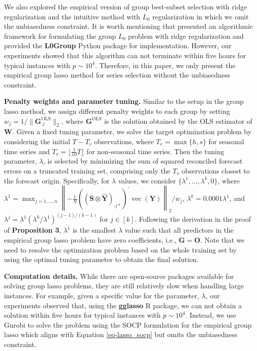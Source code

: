 \documentclass[
  11pt]{article}
\begin{document}
We also explored the empirical version of group best-subset selection
with ridge regularization and the intuitive method with \(L_0\)
regularization in which we omit the unbiasedness constraint. It is worth
mentioning that \citet{Hazimeh2023-ie} presented an algorithmic
framework for formulating the group \(L_0\) problem with ridge
regularization and provided the \textbf{L0Group} Python package for
implementation. However, our experiments showed that this algorithm can
not terminate within five hours for typical instances with
\(p \sim 10^4\). Therefore, in this paper, we only present the empirical
group lasso method for series selection without the unbiasedness
constraint.

\textbf{Penalty weights and parameter tuning.} Similar to the setup in
the group lasso method, we assign different penalty weights to each
group by setting \(w_j = 1/\|\bm{G}_{\cdot j}^{\text{OLS}}\|_2\), where
\(\bm{G}^{\text{OLS}}\) is the solution obtained by the OLS estimator of
\(\bm{W}\). Given a fixed tuning parameter, we solve the target
optimization problem by considering the initial \(T-T_v\) observations,
where \(T_v = \max\{h, s\}\) for seasonal time series and
\(T_v = \lfloor \frac{1}{10}T \rfloor\) for non-seasonal time series.
Then the tuning parameter, \(\lambda\), is selected by minimizing the
sum of squared reconciled forecast errors on a truncated training set,
comprising only the \(T_v\) observations closest to the forecast origin.
Specifically, for \(\lambda\) values, we consider
\(\{\lambda^{1},\dots,\lambda^{k}, 0\}\), where
\(\lambda^{1} = \max_{j=1, \ldots, n}\left\|-\frac{1}{N}\left(\left(\bm{S} \otimes \hat{\bm{Y}}\right)_{\cdot j*}\right)^{\prime} \operatorname{vec}(\bm{Y})\right\|_2 / w_j\),
\(\lambda^{k} = 0.0001\lambda^{1}\), and
\(\lambda^{j} = \lambda^{1}\left(\lambda^{k} / \lambda^{1}\right)^{(j-1) / (k-1)}\)
for \(j \in [k]\). Following the derivation in the proof of
\textbf{Proposition 3}, \(\lambda^{1}\) is the smallest \(\lambda\)
value such that all predictors in the empirical group lasso problem have
zero coefficients, i.e., \(\bm{G} = \bm{O}\). Note that we need to
resolve the optimization problem based on the whole training set by
using the optimal tuning parameter to obtain the final solution.

\textbf{Computation details.} While there are open-source packages
available for solving group lasso problems, they are still relatively
slow when handling large instances. For example, given a specific value
for the parameter, \(\lambda\), our experiments observed that, using the
\textbf{gglasso} R package, we can not obtain a solution within five
hours for typical instances with \(p \sim 10^4\). Instead, we use Gurobi
to solve the problem using the SOCP formulation for the empirical group
lasso which aligns with Equation \ref{eq-lasso_socp} but omits the
unbiasedness constraint.
\end{document}
